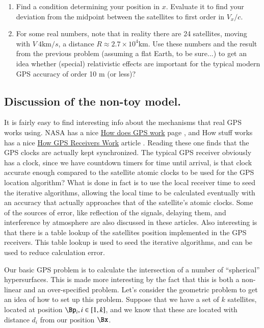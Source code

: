\begin{enumerate}
\item  Find a condition determining your position in $x$.  Evaluate it to find your deviation from the midpoint between the satellites to first order in $V_x/c$.
\item For some real numbers, note that in reality there are 24 satellites, moving with $V ~4 \text{km}/s$, a distance $R \approx 2.7 \times 10^4 \text{km}$.  Use these numbers and the result from the previous problem (assuming a flat Earth, to be sure...) to get an idea whether (special) relativistic effects are important for the typical modern GPS accuracy of order 10 m (or less)?
\end{enumerate}

\subsection{Discussion of the non-toy model.}

It is fairly easy to find interesting info about the mechanisms that real GPS works using.  NASA has a nice \href{http://www.nasm.si.edu/gps/work.html}{How does GPS work} page \cite{nasaGPS}, and How stuff works has a nice \href{http://electronics.howstuffworks.com/gadgets/travel/gps.htm}{How GPS Receivers Work} article \cite{howStuffWorksGPS}.  Reading these one finds that the GPS clocks are actually kept synchronized.  The typical GPS receiver obviously has a clock, since we have countdown timers for time until arrival, is that clock accurate enough compared to the satellite atomic clocks to be used for the GPS location algorithm?  What is done in fact is to use the local receiver time to seed the iterative algorithms, allowing the local time to be calculated eventually with an accuracy that actually approaches that of the satellite's atomic clocks.  Some of the sources of error, like reflection of the signals, delaying them, and interference by atmosphere are also discussed in these articles.  Also interesting is that there is a table lookup of the satellites position implemented in the GPS receivers.  This table lookup is used to seed the iterative algorithms, and can be used to reduce calculation error.

Our basic GPS problem is to calculate the intersection of a number of ``spherical'' hypersurfaces.  This is made more interesting by the fact that this is both a non-linear and an over-specified problem.  Let's consider the geometric problem to get an idea of how to set up this problem.  Suppose that we have a set of $k$ satellites, located at position $\Bp_i, i \in [1,k]$, and we know that these are located with distance $d_i$ from our position $\Bx$.

